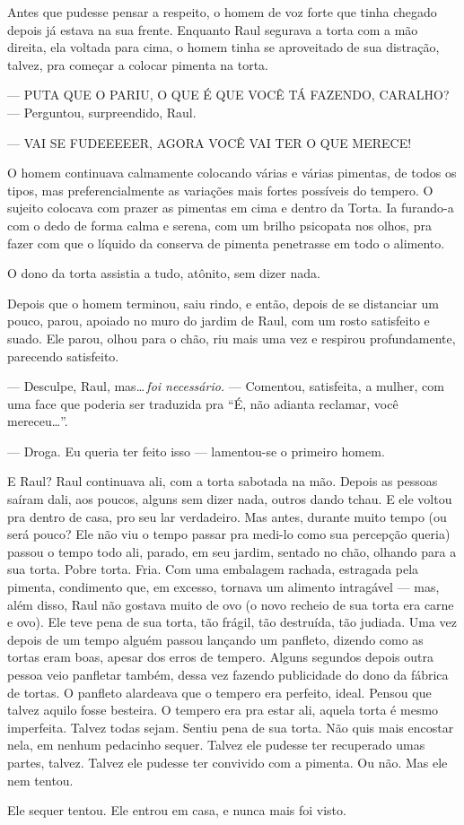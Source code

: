 Antes que pudesse pensar a respeito, o homem de voz forte que tinha chegado depois já estava na sua frente. Enquanto Raul segurava a torta com a mão direita, ela voltada para cima, o homem tinha se aproveitado de sua distração, talvez, pra começar a colocar pimenta na torta.

--- PUTA QUE O PARIU, O QUE É QUE VOCÊ TÁ FAZENDO, CARALHO? --- Perguntou, surpreendido, Raul.

--- VAI SE FUDEEEEER, AGORA VOCÊ VAI TER O QUE MERECE!

O homem continuava calmamente colocando várias e várias pimentas, de todos os tipos, mas preferencialmente as variações mais fortes possíveis do tempero. O sujeito colocava com prazer as pimentas em cima e dentro da Torta. Ia furando-a com o dedo de forma calma e serena, com um brilho psicopata nos olhos, pra fazer com que o líquido da conserva de pimenta penetrasse em todo o alimento.

O dono da torta assistia a tudo, atônito, sem dizer nada.

Depois que o homem terminou, saiu rindo, e então, depois de se distanciar um pouco, parou, apoiado no muro do jardim de Raul, com um rosto satisfeito e suado. Ele parou, olhou para o chão, riu mais uma vez e respirou profundamente, parecendo satisfeito.

--- Desculpe, Raul, mas\ldots\,\emph{foi necessário.} --- Comentou, satisfeita, a mulher, com uma face que poderia ser traduzida pra ``É, não adianta reclamar, você mereceu\ldots''.

--- Droga. Eu queria ter feito isso --- lamentou-se o primeiro homem.

E Raul? Raul continuava ali, com a torta sabotada na mão. Depois as pessoas saíram dali, aos poucos, alguns sem dizer nada, outros dando tchau. E ele voltou pra dentro de casa, pro seu lar verdadeiro. Mas antes, durante muito tempo (ou será pouco? Ele não viu o tempo passar pra medi-lo como sua percepção queria) passou o tempo todo ali, parado, em seu jardim, sentado no chão, olhando para a sua torta. Pobre torta. Fria. Com uma embalagem rachada, estragada pela pimenta, condimento que, em excesso, tornava um alimento intragável --- mas, além disso, Raul não gostava muito de ovo (o novo recheio de sua torta era carne e ovo). Ele teve pena de sua torta, tão frágil, tão destruída, tão judiada. Uma vez depois de um tempo alguém passou lançando um panfleto, dizendo como as tortas eram boas, apesar dos erros de tempero. Alguns segundos depois outra pessoa veio panfletar também, dessa vez fazendo publicidade do dono da fábrica de tortas. O panfleto alardeava que o tempero era perfeito, ideal. Pensou que talvez aquilo fosse besteira. O tempero era pra estar ali, aquela torta é mesmo imperfeita. Talvez todas sejam. Sentiu pena de sua torta. Não quis mais encostar nela, em nenhum pedacinho sequer. Talvez ele pudesse ter recuperado umas partes, talvez. Talvez ele pudesse ter convivido com a pimenta. Ou não. Mas ele nem tentou.

Ele sequer tentou. Ele entrou em casa, e nunca mais foi visto.
